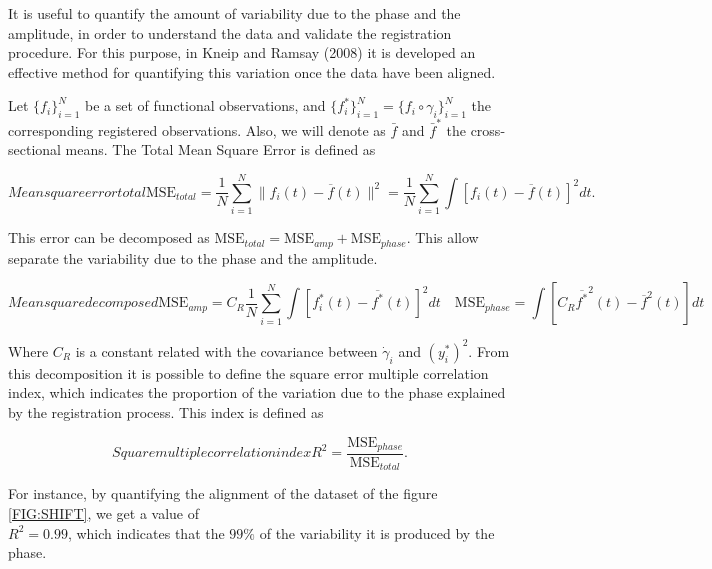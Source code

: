 It is useful to quantify the amount of variability due to the phase and the
amplitude, in order to understand the data and validate the registration
procedure. For this purpose, in Kneip and Ramsay (2008)
\cite{RamsayAlois2008} it is developed an effective method for quantifying
this variation once the data have been aligned.

Let $\{f_i\}_{i=1}^N$ be a set of functional observations, and
$\{f^*_i\}_{i=1}^N = \{f_i \circ \gamma_i\}_{i=1}^N$ the corresponding registered
observations. Also, we will denote as $\bar f$ and $\bar f^*$ the
cross-sectional means. The Total Mean Square Error is defined as

\begin{equation}[]{Mean square error total}
\text{MSE}_{total}=  \frac{1}{N}\sum_{i=1}^{N} \|f_i(t)-\overline f(t)\|^2 =
\frac{1}{N}\sum_{i=1}^{N}\int[f_i(t)-\overline f(t)]^2dt .
\end{equation}

This error can be decomposed as
$\text{MSE}_{total} = \text{MSE}_{amp} + \text{MSE}_{phase}$. This allow separate
the variability due to the phase and the amplitude.

\begin{equation}[]{Mean square decomposed}
\text{MSE}_{amp} =  C_R \frac{1}{N}
        \sum_{i=1}^{N} \int \left [ f^*_i(t) - \overline{f^*}(t) \right ]^2 dt \quad
\text{MSE}_{phase}=
        \int \left [C_R \overline{f^*}^2(t) - \overline{f}^2(t) \right]dt
\end{equation}


Where $C_R$ is a constant related with the covariance between $\dot \gamma_i$
and $(y_i^*)^2$.
From this decomposition it is possible to define the
square error multiple correlation index, which indicates the proportion of the
variation due to the phase
explained by the registration process. This index is defined as

\begin{equation}[]{Square multiple correlation index}
R^2 = \frac{\text{MSE}_{phase}}{\text{MSE}_{total}}.
\end{equation}

For instance, by quantifying the alignment of the dataset of the figure
\ref{FIG:SHIFT}, we get a value of \\ $R^2=0.99$, which indicates that the $99\%$ of
the variability it is produced by the phase.
